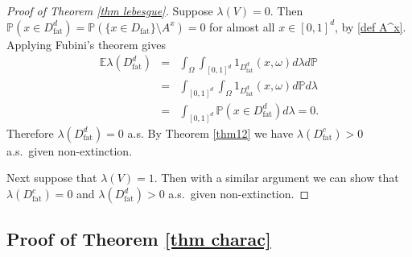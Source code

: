 \documentclass[11pt,a4paper]{article}
\newcommand{\IE}{\ensuremath{\mathbb{E}}}
\newcommand{\IP}{\ensuremath{\mathbb{P}}}
\newcommand{\Dfat}{\ensuremath{D_{\text{fat}}}}
\newcommand{\Dfatc}{\ensuremath{D_{\text{fat}}^{c}}}
\newcommand{\Dfatd}{\ensuremath{D_{\text{fat}}^{d}}}
\theoremstyle{remark}
\begin{document}
\begin{proof}[Proof of Theorem \ref{thm lebesgue}]
Suppose $\lambda(V)=0$. Then $\IP(x \in \Dfatd)=\IP(\{x\in \Dfat\} \setminus A^x)=0$ for almost all $x\in [0,1]^d$, by \eqref{def A^x}. Applying Fubini's theorem gives
\begin{eqnarray*}
 \IE \lambda (\Dfatd) &=& \int_{\Omega}\int_{[0,1]^{d}} 1_{\Dfatd}(x,\omega)d\lambda d\IP \\
&=&  \int_{[0,1]^{d}}\int_{\Omega} 1_{\Dfatd}(x,\omega) d\IP d\lambda\\
&=& \int_{[0,1]^{d}} \IP(x \in \Dfatd) d\lambda = 0.
\end{eqnarray*}
 Therefore $\lambda(\Dfatd)=0$ a.s. By Theorem \ref{thm12} we have $\lambda(\Dfatc)> 0$ a.s.\ given non-extinction.

Next suppose that $\lambda(V)=1$. Then with a similar argument we can show that $\lambda(\Dfatc)=0$ and $\lambda(\Dfatd)>0$ a.s.\ given non-extinction. 
\end{proof}





\subsection{Proof of Theorem \ref{thm charac}}
\end{document}
